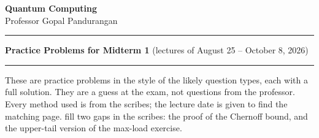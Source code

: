 \documentclass[a4paper,11pt,final]{article}
\theoremstyle{plain}
\theoremstyle{definition}
\begin{document}
\begin{center}
\textbf{\large Quantum Computing} \\

Professor Gopal Pandurangan\\
\vspace{0.1in}
\end{center}

\hrule

\vspace{0.1in}

\textbf{Practice Problems for Midterm 1} (lectures of August 25 -- October 8, 2026)

\vspace{0.1in}

\hrule

\vspace{0.1in}

These are practice problems in the style of the likely question types, each with a full solution.
They are a guess at the exam, not questions from the professor. Every method used is from the
scribes; the lecture date is given to find the matching page.
 fill two gaps in the scribes: the proof of the Chernoff bound, and
the upper-tail version of the max-load exercise.

\tableofcontents

\clearpage







\end{document}
